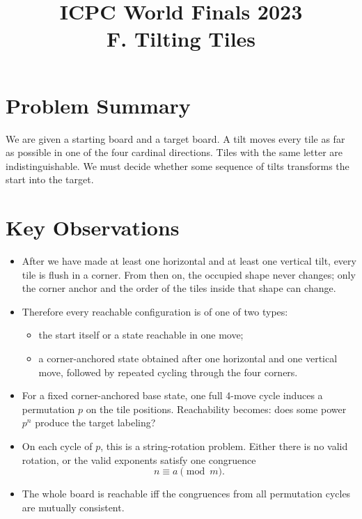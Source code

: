 \documentclass[11pt]{article}
\title{ICPC World Finals 2023\\F. Tilting Tiles}
\author{}
\date{}
\begin{document}
\maketitle

\section*{Problem Summary}

We are given a starting board and a target board. A tilt moves every tile as far as possible in one of the
four cardinal directions. Tiles with the same letter are indistinguishable. We must decide whether some
sequence of tilts transforms the start into the target.

\section*{Key Observations}

\begin{itemize}[leftmargin=*]
    \item After we have made at least one horizontal and at least one vertical tilt, every tile is flush in a
    corner. From then on, the occupied shape never changes; only the corner anchor and the order of the
    tiles inside that shape can change.
    \item Therefore every reachable configuration is of one of two types:
    \begin{itemize}[leftmargin=*]
        \item the start itself or a state reachable in one move;
        \item a corner-anchored state obtained after one horizontal and one vertical move, followed by
        repeated cycling through the four corners.
    \end{itemize}
    \item For a fixed corner-anchored base state, one full 4-move cycle induces a permutation $p$ on the
    tile positions. Reachability becomes: does some power $p^n$ produce the target labeling?
    \item On each cycle of $p$, this is a string-rotation problem. Either there is no valid rotation, or the
    valid exponents satisfy one congruence
    \[
    n \equiv a \pmod m.
    \]
    \item The whole board is reachable iff the congruences from all permutation cycles are mutually
    consistent.
\end{itemize}
\end{document}

